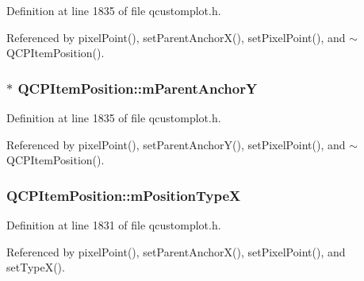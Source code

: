 Definition at line 1835 of file qcustomplot.\+h.



Referenced by pixel\+Point(), set\+Parent\+Anchor\+X(), set\+Pixel\+Point(), and $\sim$\+Q\+C\+P\+Item\+Position().

\hypertarget{class_q_c_p_item_position_afc6142a6a09c8fa41c44d3d54fadd737}{}
\subsubsection[{m\+Parent\+Anchor\+Y}]{ $\ast$ Q\+C\+P\+Item\+Position\+::m\+Parent\+Anchor\+Y\hspace{0.3cm}{\ttfamily [protected]}}\label{class_q_c_p_item_position_afc6142a6a09c8fa41c44d3d54fadd737}


Definition at line 1835 of file qcustomplot.\+h.



Referenced by pixel\+Point(), set\+Parent\+Anchor\+Y(), set\+Pixel\+Point(), and $\sim$\+Q\+C\+P\+Item\+Position().

\hypertarget{class_q_c_p_item_position_ae2a617dce057c5f3ec6878c1823aa291}{}
\subsubsection[{m\+Position\+Type\+X}]{ Q\+C\+P\+Item\+Position\+::m\+Position\+Type\+X\hspace{0.3cm}{\ttfamily [protected]}}\label{class_q_c_p_item_position_ae2a617dce057c5f3ec6878c1823aa291}


Definition at line 1831 of file qcustomplot.\+h.



Referenced by pixel\+Point(), set\+Parent\+Anchor\+X(), set\+Pixel\+Point(), and set\+Type\+X().

\hypertarget{class_q_c_p_item_position_a47c96c0ef4380e1af4aaa7c2265c260b}{}
